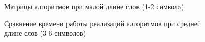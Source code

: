 \begin{figure}[h!]
	\caption{Матрицы алгоритмов при малой длине слов (1-2 символa)}
	\label{fig:аб_матрица}
\end{figure}

\begin{figure}[h!]
	\caption{Сравнение времени работы реализаций алгоритмов при средней длине слов (3-6 символов)}
	\label{fig:среднее}
\end{figure}

